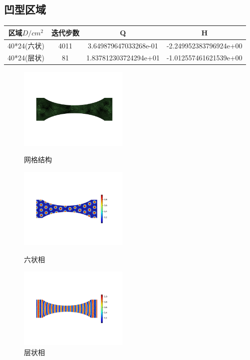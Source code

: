 \documentclass[12pt]{article}
\begin{document}
\begin{CJK}{UTF8}{gkai}
    \subsection{凹型区域}   
    \begin{table}[H]
    		\centering
    	\begin{tabular}{cccc}
    		\toprule
    		区域$D/cm^2$ &	迭代步数 & Q &  H \\
    		\midrule
    		40*24(六状)&4011 &3.649879647033268e-01 & -2.249952383796924e+00\\
    		40*24(层状)&81& 1.837812303724294e+01 & -1.012557461621539e+00\\
    		\bottomrule
    	\end{tabular}
    \end{table}
    
    \begin{figure}[H]
    	\setlength{\abovecaptionskip}{0.cm}
    	\setlength{\belowcaptionskip}{-0.cm}
    	\begin{minipage}[!htbp]{0.3\linewidth}
    		\includegraphics[width=5.2cm]{Figure_ac.png}
    		\caption*{网格结构}
    	\end{minipage}
    	\hspace{0.23in}
    	\begin{minipage}[!htbp]{0.3\linewidth}
    		\includegraphics[width=5.2cm]{scftfigure4000.png}
    		\caption*{六状相}
    	\end{minipage}
    	\hspace{0.23in}
    	\begin{minipage}[!htbp]{0.3\linewidth}
    		\includegraphics[width=5.2cm]{scftfigure80.png}
    		\caption*{层状相}
    	\end{minipage}
    \end{figure} 

\end{CJK}
\end{document}
